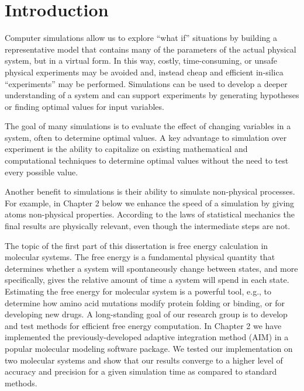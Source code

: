 \chapter{Introduction}

Computer simulations allow us to explore ``what if'' situations by building a representative model that contains many of the parameters of the actual physical system, but in a virtual form. In this way, costly, time-consuming, or unsafe physical experiments may be avoided and, instead cheap and efficient in-silica ``experiments'' may be performed. Simulations can be used to develop a deeper understanding of a system and can support experiments by generating hypotheses or finding optimal values for input variables.

The goal of many simulations is to evaluate the effect of changing variables in a system, often to determine optimal values. A key advantage to simulation over experiment is the ability to capitalize on existing mathematical and computational techniques to determine optimal values without the need to test every possible value.

Another benefit to simulations is their ability to simulate non-physical processes. For example, in Chapter 2 below we enhance the speed of a simulation by giving atoms non-physical properties. According to the laws of statistical mechanics the final results are physically relevant, even though the intermediate steps are not.

The topic of the first part of this dissertation is free energy calculation in molecular systems. The free energy is a fundamental physical quantity that determines whether a system will spontaneously change between states, and more specifically, gives the relative amount of time a system will spend in each state. Estimating the free energy for molecular system is a powerful tool, e.g., to determine how amino acid mutations modify protein folding or binding, or for developing new drugs. A long-standing goal of our research group is to develop and test methods for efficient free energy computation. In Chapter 2 we have implemented the previously-developed adaptive integration method (AIM) in a popular molecular modeling software package. We tested our implementation on two molecular systems and show that our results converge to a higher level of accuracy and precision for a given simulation time as compared to standard methods.

